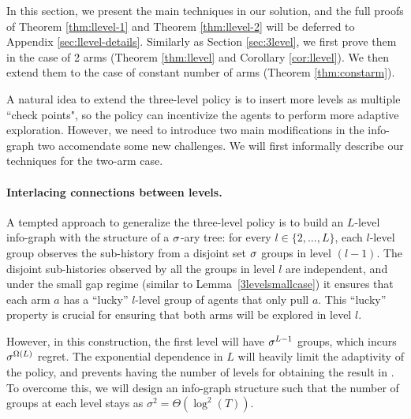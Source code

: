In this section, we present the main techniques in our solution, and
the full proofs of Theorem \ref{thm:llevel-1} and Theorem
\ref{thm:llevel-2} will be deferred to Appendix
\ref{sec:llevel-details}. Similarly as Section \ref{sec:3level}, we
first prove them in the case of 2 arms (Theorem \ref{thm:llevel} and
Corollary \ref{cor:llevel}). We then extend them to the case of
constant number of arms (Theorem \ref{thm:constarm}).

A natural idea to extend the three-level policy is to insert more
levels as multiple ``check points", so the policy can incentivize the
agents to perform more adaptive exploration. However, we need to
introduce two main modifications in the info-graph two accomendate
some new challenges. We will first informally describe our techniques
for the two-arm case.




\paragraph{Interlacing connections between levels.}A tempted approach
to generalize the three-level policy is to build an $L$-level
info-graph with the structure of a $\sigma$-ary tree: for every
$l\in \{2, \ldots , L\}$, each $l$-level group observes the
sub-history from a disjoint set $\sigma$ groups in level $(l-1)$. The
disjoint sub-histories observed by all the groups in level $l$ are
independent, and under the small gap regime (similar to
Lemma~\ref{3levelsmallcase}) it ensures that each arm $a$ has a
``lucky'' $l$-level group of agents that only pull $a$. This ``lucky''
property is crucial for ensuring that both arms will be explored in
level $l$.

However, in this construction, the first level will have $\sigma^{L-1}$
groups, which incurs $\sigma^{\Omega(L)}$ regret. The exponential
dependence in $L$ will heavily limit the adaptivity of the policy, and
prevents having the number of levels for obtaining the result in
. To overcome this, we will design an info-graph
structure such that the number of groups at each level stays as
$\sigma^2 = \Theta(\log^2(T))$.

